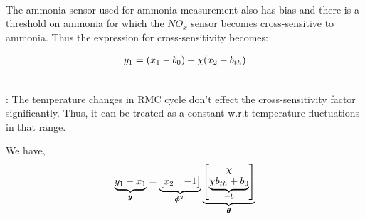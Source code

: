 \\
The ammonia sensor used for ammonia measurement also has bias and there is a
threshold on ammonia for which the $NO_x$ sensor becomes cross-sensitive to
ammonia. Thus the expression for cross-sensitivity becomes:

\begin{align*}
    y_1 &= \left( x_1 - b_0 \right) + \chi (x_2 - b_{th})\\
\end{align*}

\\
: The temperature changes in RMC cycle don't effect the
cross-sensitivity factor significantly. Thus, it can be treated as a constant
w.r.t temperature fluctuations in that range.

We have,
\begin{align*}
    \underbrace{y_1 - x_1}_{\pmb y} &= \underbrace{\begin{bmatrix} x_2 & -1 \end{bmatrix}}_{\pmb \phi^T} \underbrace{\begin{bmatrix}  \chi \\ \underbrace{\chi b_{th} + b_0}_{=b} \end{bmatrix}}_{ \pmb \theta}\\
\end{align*}

